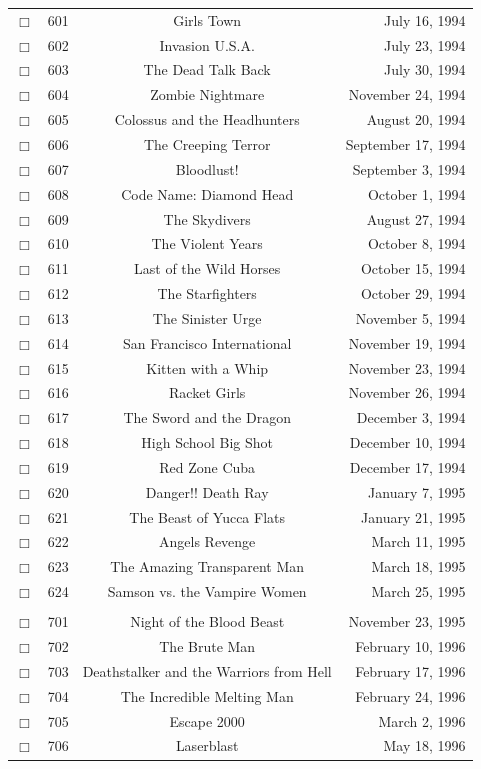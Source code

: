 \documentclass[12pt]{article}
\begin{document}
\begin{center}
\begin{longtable}[c]{cccr}
\\  %
$\Box$&601&Girls Town&July 16, 1994\\
$\Box$&602&Invasion U.S.A.&July 23, 1994\\
$\Box$&603&The Dead Talk Back&July 30, 1994\\
$\Box$&604&Zombie Nightmare&November 24, 1994\\
$\Box$&605&Colossus and the Headhunters&August 20, 1994\\
$\Box$&606&The Creeping Terror&September 17, 1994\\
$\Box$&607&Bloodlust!&September  3, 1994\\
$\Box$&608&Code Name: Diamond Head&October  1, 1994\\
$\Box$&609&The Skydivers&August 27, 1994\\
$\Box$&610&The Violent Years&October  8, 1994\\
$\Box$&611&Last of the Wild Horses&October 15, 1994\\
$\Box$&612&The Starfighters&October 29, 1994\\
$\Box$&613&The Sinister Urge&November  5, 1994\\
$\Box$&614&San Francisco International&November 19, 1994\\
$\Box$&615&Kitten with a Whip&November 23, 1994\\
$\Box$&616&Racket Girls&November 26, 1994\\
$\Box$&617&The Sword and the Dragon&December  3, 1994\\
$\Box$&618&High School Big Shot&December 10, 1994\\
$\Box$&619&Red Zone Cuba&December 17, 1994\\
$\Box$&620&Danger!! Death Ray&January  7, 1995\\
$\Box$&621&The Beast of Yucca Flats&January 21, 1995\\
$\Box$&622&Angels Revenge&March 11, 1995\\
$\Box$&623&The Amazing Transparent Man&March 18, 1995\\
$\Box$&624&Samson vs. the Vampire Women&March 25, 1995\\  %

\\  %
$\Box$&701&Night of the Blood Beast&November 23, 1995\\
$\Box$&702&The Brute Man&February 10, 1996\\
$\Box$&703&Deathstalker and the Warriors from Hell&February 17, 1996\\
$\Box$&704&The Incredible Melting Man&February 24, 1996\\
$\Box$&705&Escape 2000&March  2, 1996\\
$\Box$&706&Laserblast&May 18, 1996\\  %


\end{longtable}
\end{center}
\end{document}
